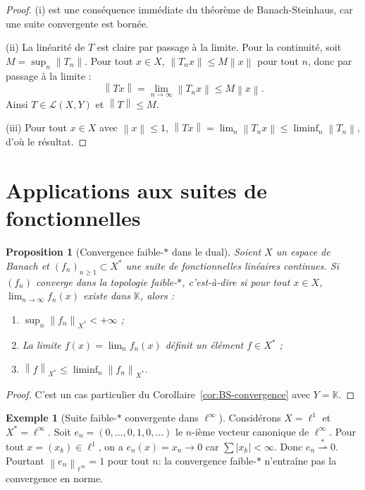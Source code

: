 \documentclass[a4paper,12pt]{book}
\newcommand{\K}{\mathbb{K}}
\newcommand{\norm}[1]{\left\| #1 \right\|}
\newcommand{\abs}[1]{\left| #1 \right|}
\newcommand{\weakstarto}{\overset{*}{\rightharpoonup}}
\theoremstyle{definition}
\newtheorem{exemple}[definition]{Exemple}
\theoremstyle{plain}
\newtheorem{proposition}[definition]{Proposition}
\theoremstyle{remark}
\begin{document}
\begin{proof}
(i) est une conséquence immédiate du théorème de Banach-Steinhaus, car une suite
convergente est bornée.

(ii) La linéarité de $T$ est claire par passage à la limite. Pour la continuité,
soit $M = \sup_n \norm{T_n}$. Pour tout $x \in X$, $\norm{T_n x} \leq M \norm{x}$
pour tout $n$, donc par passage à la limite :
\[
  \norm{Tx} = \lim_{n \to \infty} \norm{T_n x} \leq M \norm{x}.
\]
Ainsi $T \in \mathcal{L}(X,Y)$ et $\norm{T} \leq M$.

(iii) Pour tout $x \in X$ avec $\norm{x} \leq 1$,
$\norm{Tx} = \lim_n \norm{T_n x} \leq \liminf_n \norm{T_n}$, d'où le résultat.
\end{proof}


\section{Applications aux suites de fonctionnelles}
\label{sec:suites-fonctionnelles}


\begin{proposition}[Convergence faible-$*$ dans le dual]
\label{prop:weak-star-bounded}
Soient $X$ un espace de Banach et $(f_n)_{n \geq 1} \subset X^*$ une suite
de fonctionnelles linéaires continues. Si $(f_n)$ converge dans la topologie
faible-$*$, c'est-à-dire si pour tout $x \in X$,
$\lim_{n \to \infty} f_n(x)$ existe dans $\K$, alors :
\begin{enumerate}[label=(\roman*)]
  \item $\sup_n \norm{f_n}_{X^*} < +\infty$ ;
  \item La limite $f(x) = \lim_n f_n(x)$ définit un élément $f \in X^*$ ;
  \item $\norm{f}_{X^*} \leq \liminf_n \norm{f_n}_{X^*}$.
\end{enumerate}
\end{proposition}

\begin{proof}
C'est un cas particulier du Corollaire~\ref{cor:BS-convergence} avec $Y = \K$.
\end{proof}

\begin{exemple}[Suite faible-$*$ convergente dans $\ell^\infty$]
\label{ex:weak-star-linfty}
\index{$\ell^\infty$}
Considérons $X = \ell^1$ et $X^* = \ell^\infty$.
Soit $e_n = (0,\ldots,0,1,0,\ldots)$ le $n$-ième vecteur canonique de $\ell^\infty$.
Pour tout $x = (x_k) \in \ell^1$, on a $e_n(x) = x_n \to 0$ car $\sum \abs{x_k} < \infty$.
Donc $e_n \weakstarto 0$. Pourtant $\norm{e_n}_{\ell^\infty} = 1$ pour tout $n$:
la convergence faible-$*$ n'entraîne pas la convergence en norme.
\end{exemple}
\end{document}
